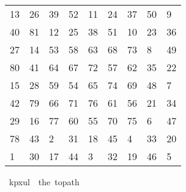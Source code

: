 \begin{isabellebody}
\begin{isamarkuptext}
\begin{table}[H]
\begin{tabular}{lllllllll}
      13 & 26 & 39 & 52 & 11 & 24 & 37 & 50 &  9 \\
      40 & 81 & 12 & 25 & 38 & 51 & 10 & 23 & 36 \\
      27 & 14 & 53 & 58 & 63 & 68 & 73 &  8 & 49 \\
      80 & 41 & 64 & 67 & 72 & 57 & 62 & 35 & 22 \\
      15 & 28 & 59 & 54 & 65 & 74 & 69 & 48 &  7 \\
      42 & 79 & 66 & 71 & 76 & 61 & 56 & 21 & 34 \\
      29 & 16 & 77 & 60 & 55 & 70 & 75 &  6 & 47 \\
      78 & 43 &  2 & 31 & 18 & 45 &  4 & 33 & 20 \\
       1 & 30 & 17 & 44 &  3 & 32 & 19 & 46 &  5
    \end{tabular}
  \end{table}%
\end{isamarkuptext}\isamarkuptrue%
\isamarkupfalse%
\ {\isachardoublequoteopen}kp{}x{}ul\ {\isasymequiv}\ the\ {\isacharparenleft}{\kern0pt}to{\isacharunderscore}{\kern0pt}path\ \isanewline
\ \ {\isacharbrackleft}{\kern0pt}{\isacharbrackleft}{\kern0pt}{}{}{\isacharcomma}{\kern0pt}{}{}{\isacharcomma}{\kern0pt}{}{}{\isacharcomma}{\kern0pt}{}{}{\isacharcomma}{\kern0pt}{}{}{\isacharcomma}{\kern0pt}{}{}{\isacharcomma}{\kern0pt}{}{}{\isacharcomma}{\kern0pt}{}{}{\isacharcomma}{\kern0pt}{}{\isacharbrackright}{\kern0pt}{\isacharcomma}{\kern0pt}\isanewline
\ \ {\isacharbrackleft}{\kern0pt}{}{}{\isacharcomma}{\kern0pt}{}{}{\isacharcomma}{\kern0pt}{}{}{\isacharcomma}{\kern0pt}{}{}{\isacharcomma}{\kern0pt}{}{}{\isacharcomma}{\kern0pt}{}{}{\isacharcomma}{\kern0pt}{}{}{\isacharcomma}{\kern0pt}{}{}{\isacharcomma}{\kern0pt}{}{}{\isacharbrackright}{\kern0pt}{\isacharcomma}{\kern0pt}\isanewline
\ \ {\isacharbrackleft}{\kern0pt}{}{}{\isacharcomma}{\kern0pt}{}{}{\isacharcomma}{\kern0pt}{}{}{\isacharcomma}{\kern0pt}{}{}{\isacharcomma}{\kern0pt}{}{}{\isacharcomma}{\kern0pt}{}{}{\isacharcomma}{\kern0pt}{}{}{\isacharcomma}{\kern0pt}{}{\isacharcomma}{\kern0pt}{}{}{\isacharbrackright}{\kern0pt}{\isacharcomma}{\kern0pt}\isanewline

\end{isabellebody}
